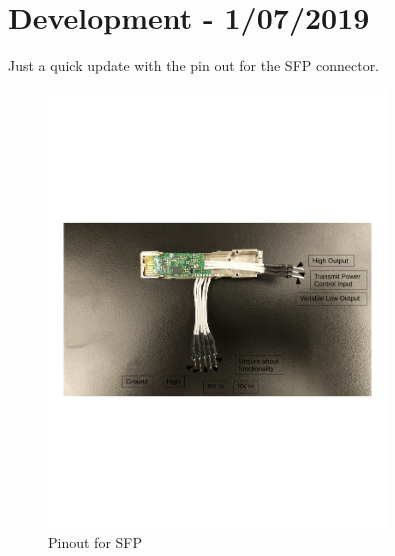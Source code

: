 \section{Development - 1/07/2019}
Just a quick update with the pin out for the \ac{SFP} connector.

\begin{figure}[H]
  \includegraphics[width=0.8\textwidth]{IMG_20190701_1606117.pdf}
  \caption{Pinout for \ac{SFP}}
  \label{fig:pinout_sfp}
\end{figure}

